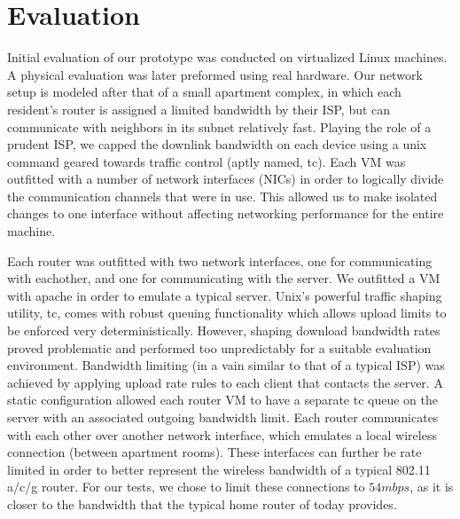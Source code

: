 \documentclass[12pt]{article}
\begin{document}
\newpage
\section{Evaluation}

	Initial evaluation of our prototype was conducted on virtualized Linux machines. A physical evaluation was later preformed using real hardware. Our network setup is modeled after that of a small apartment complex, in which each resident's router is assigned a limited bandwidth by their ISP, but can communicate with neighbors in its subnet relatively fast. Playing the role of a prudent ISP, we capped the downlink bandwidth on each device using a unix command geared towards traffic control (aptly named, tc). Each VM was outfitted with a number of network interfaces (NICs) in order to logically divide the communication channels that were in use. This allowed us to make isolated changes to one interface without affecting networking performance for the entire machine. 

	Each router was outfitted with two network interfaces, one for communicating with eachother, and one for communicating with the server. We outfitted a VM with apache in order to emulate a typical server. Unix's powerful traffic shaping utility, tc, comes with robust queuing functionality which allows upload limits to be enforced very deterministically. However, shaping download bandwidth rates proved problematic and performed too unpredictably for a suitable evaluation environment. Bandwidth limiting (in a vain similar to that of a typical ISP) was achieved by applying upload rate rules to each client that contacts the server. A static configuration allowed each router VM to have a separate tc queue on the server with an associated outgoing bandwidth limit. Each router communicates with each other over another network interface, which emulates a local wireless connection (between apartment rooms). These interfaces can further be rate limited in order to better represent the wireless bandwidth of a typical 802.11 a/c/g router. For our tests, we chose to limit these connections to $54 mbps$, as it is closer to the bandwidth that the typical home router of today provides.
\end{document}
